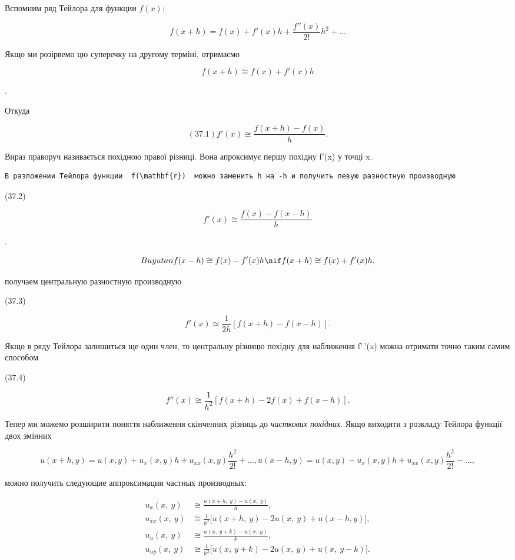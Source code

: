 \documentclass[
  ukrainian,
]{article}
\begin{document}
Вспомним ряд Тейлора для функции \(f(x)\):

\[
f(x+h) = f(x) + f'(x)h + \frac{f''(x)}{2!}h^2 + \dots
\]

Якщо ми розірвемо цю суперечку на другому терміні, отримаємо

\[
f(x+h) \cong f(x) + f'(x) h
\]

.

Откуда

\[
(37.1) f'(x) \cong \frac{f(x+h)-f(x)}{h}.
\]

Вираз праворуч називається похідною правої різниці. Вона апроксимує
першу похідну f'(x) у точці x.

\begin{verbatim}
В разложении Тейлора функции  f(\mathbf{r})  можно заменить h на -h и получить левую разностную производную
\end{verbatim}

(37.2)

\[
f'(x) \cong \frac{f(x) - f(x - h)}{h}
\]

.

\[
Buyutan  f(x - h) \cong f(x) - f'(x) h  \nif  f(x + h) \cong f( x) + f'(x) h  ,
\]

получаем центральную разностную производную

(37.3)

\[
f'(x) \simeq \frac{1}{2h} [f(x+h) - f(x-h)].
\]

Якщо в ряду Тейлора залишиться ще один член, то центральну різницю
похідну для наближення f'\,'(x) можна отримати точно таким самим
способом

(37.4)

\[
f''(x) \cong \frac{1}{h^2} [f(x+h) - 2f(x) + f(x-h)].
\]

Тепер ми можемо розширити поняття наближення скінченних різниць до
\emph{часткових похідних}. Якщо виходити з розкладу Тейлора функції двох
змінних

\[
u(x+h, y) = u(x, y) + u_x(x, y)h + u_{xx}(x, y)\frac{h^2}{2!} + \dots,
u(x-h, y) = u(x, y) - u_x(x, y)h + u_{xx}(x, y)\frac{h^2}{2!} - \dots,
\]

можно получить следующие аппроксимации частных производных:

\[
\begin{split} u_x(x,\ y) & \cong \frac{u(x+h,\ y)-u(x,\ y)}{h}, \\ u_{xx}(x,\ y) & \cong \frac{1}{h^2} \big[ u(x+h,\ y)-2u(x,\ y)+u(x-h,y) \big], \\ u_u(x,\ y) & \cong \frac{u(x,\ y+k)-u(x,\ y)}{k}, \\ u_{uy}(x,\ y) & \cong \frac{1}{h^2} \big[ u(x,\ y+k)-2u(x,\ y)+u(x,\ y-k) \big]. \end{split}
\]
\end{document}

